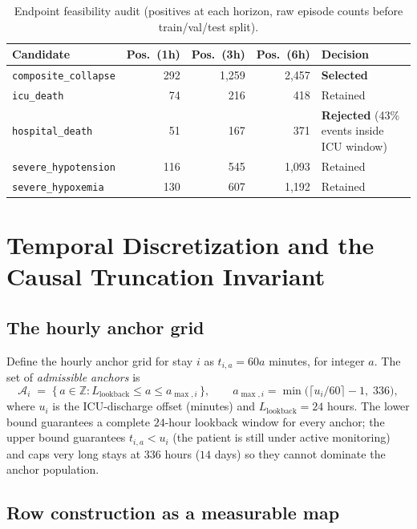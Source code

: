 \documentclass[11pt]{article}
\newcommand{\1}[1]{\mathbf{1}\!\left[#1\right]}
\begin{document}
\begin{table}[h]
\centering
\caption{Endpoint feasibility audit (positives at each horizon, raw episode counts before train/val/test split).}
\label{tab:endpoint-audit}
\begin{tabular}{lrrrl}
\toprule
Candidate & Pos.\ (1h) & Pos.\ (3h) & Pos.\ (6h) & Decision \\
\midrule
\texttt{composite\_collapse} & 292 & 1{,}259 & 2{,}457 & \textbf{Selected} \\
\texttt{icu\_death} & 74 & 216 & 418 & Retained \\
\texttt{hospital\_death} & 51 & 167 & 371 & \textbf{Rejected} (43\% events inside ICU window) \\
\texttt{severe\_hypotension} & 116 & 545 & 1{,}093 & Retained \\
\texttt{severe\_hypoxemia} & 130 & 607 & 1{,}192 & Retained \\
\bottomrule
\end{tabular}
\end{table}

\section{Temporal Discretization and the Causal Truncation Invariant}\label{sec:causality}

\subsection{The hourly anchor grid}

Define the hourly anchor grid for stay $i$ as $t_{i,a} = 60a$ minutes, for integer $a$. The set of \emph{admissible anchors} is
\begin{equation}
\mathcal{A}_i \;=\; \{\, a \in \mathbb{Z} : L_{\mathrm{lookback}} \le a \le a_{\max,i} \,\}, \qquad a_{\max,i} = \min\!\Big(\big\lceil u_i / 60\big\rceil - 1,\; 336\Big),
\end{equation}
where $u_i$ is the ICU-discharge offset (minutes) and $L_{\mathrm{lookback}}=24$ hours. The lower bound guarantees a complete $24$-hour lookback window for every anchor; the upper bound guarantees $t_{i,a} < u_i$ (the patient is still under active monitoring) and caps very long stays at $336$ hours ($14$ days) so they cannot dominate the anchor population.

\subsection{Row construction as a measurable map}
\end{document}
